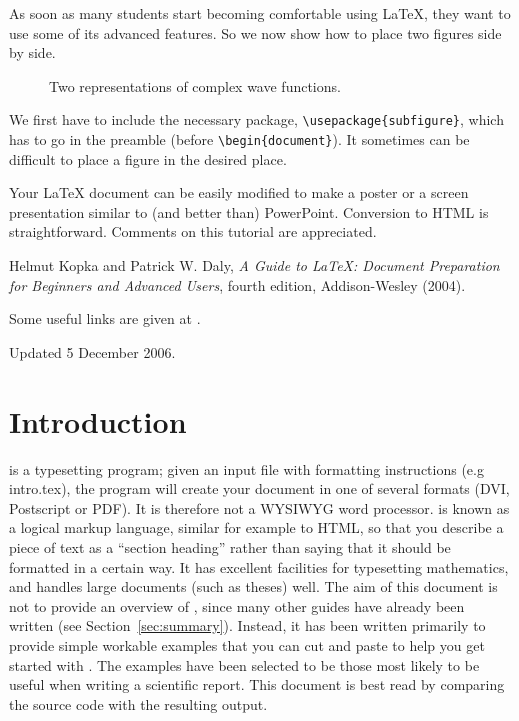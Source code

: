 \documentclass[12pt]{article}
\begin{document}
As soon as many students start becoming comfortable using \LaTeX, they want
to use some of its advanced features. So we now show how to place two
figures side by side.

\begin{figure}[h!]
  \begin{center}
    \caption{\label{fig:qm/complexfunctions} Two representations of complex
    wave functions.}
  \end{center}
\end{figure}

We first have to include the necessary package,
\verb+\usepackage{subfigure}+, which has to go in the preamble (before
\verb+\begin{document}+). It sometimes can be difficult to place a figure in
the desired place.

Your LaTeX document can be easily modified to make a poster or a screen
presentation similar to (and better than) PowerPoint. Conversion to HTML is
straightforward. Comments on this tutorial are appreciated.

\begin{thebibliography}{5}

  Helmut Kopka and Patrick W. Daly, \textsl{A Guide to
  \LaTeX: Document Preparation for Beginners and Advanced Users},
  fourth edition, Addison-Wesley (2004).

  Some useful links are
  given at \url{}.

\end{thebibliography}

{\small \noindent Updated 5 December 2006.}
\section{Introduction}

\latex is a typesetting program; given an input file with formatting
instructions (e.g intro.tex), the program will create your document in
one of several formats (DVI, Postscript or PDF).  It is therefore not
a WYSIWYG word processor.  \latex is known as a logical markup
language, similar for example to HTML, so that you describe a piece of
text as a ``section heading'' rather than saying that it should be
formatted in a certain way.  It has excellent facilities for
typesetting mathematics, and handles large documents (such as theses)
well.  The aim of this document is not to provide an overview of
\latex, since many other guides have already been written (see
Section~\ref{sec:summary}).  Instead, it has been written primarily to
provide simple workable examples that you can cut and paste to help
you get started with \latex.  The examples have been selected to be
those most likely to be useful when writing a scientific report.  This
document is best read by comparing the source code with the resulting
output.
\end{document}
